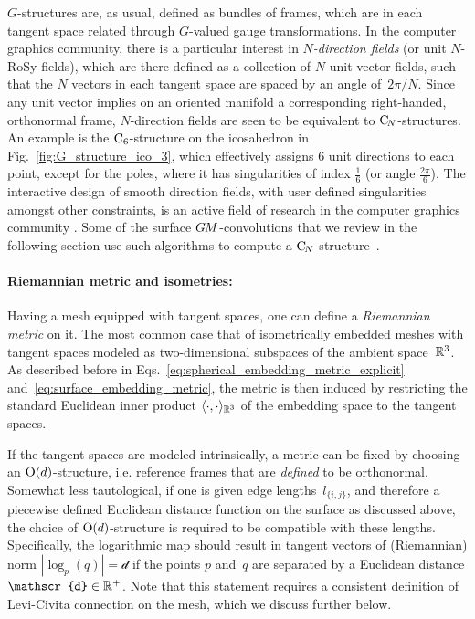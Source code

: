 $G$-structures are, as usual, defined as bundles of frames, which are in each tangent space related through $G$-valued gauge transformations.
In the computer graphics community, there is a particular interest in \emph{$N$-direction fields} (or unit $N$-RoSy fields), which are there defined as a collection of $N$ unit vector fields, such that the $N$ vectors in each tangent space are spaced by an angle of~$2\pi/N$.
Since any unit vector implies on an oriented manifold a corresponding right-handed, orthonormal frame, $N$-direction fields are seen to be equivalent to $\operatorname{C}_{\!N}$-structures.
An example is the $\operatorname{C}_{6}$-structure on the icosahedron in Fig.~\ref{fig:G_structure_ico_3}, which effectively assigns $6$ unit directions to each point, except for the poles, where it has singularities of index $\frac{1}{6}$ (or angle $\frac{2\pi}{6}$).
The interactive design of smooth direction fields, with user defined singularities amongst other constraints, is an active field of research in the computer graphics community
\cite{li2006representing,ray2008nSymmDirectionField,lai2009metric,craneTrivialConnectionsDiscrete2010,Knoppel:2013:GOD,liu2016discreteConnection,Sharp2019VectorHeatMethod}.
Some of the surface $G\mkern-1.4muM$-convolutions that we review in the following section use such algorithms to compute a $\operatorname{C}_{\!N}$-structure~\cite{huang2019texturenet,Yang2020parallelFrameCNN}.



\paragraph{Riemannian metric and isometries:}
Having a mesh equipped with tangent spaces, one can define a \emph{Riemannian metric} on it.
The most common case that of isometrically embedded meshes with tangent spaces modeled as two-dimensional subspaces of the ambient space~$\mathbb{R}^3$.
As described before in Eqs.~\eqref{eq:spherical_embedding_metric_explicit} and~\eqref{eq:surface_embedding_metric}, the metric is then induced by restricting the standard Euclidean inner product $\langle\cdot,\cdot\rangle_{\mathbb{R}^3}$ of the embedding space to the tangent spaces.

If the tangent spaces are modeled intrinsically, a metric can be fixed by choosing an $\operatorname{O}(d)$-structure, i.e. reference frames that are \emph{defined} to be orthonormal.
Somewhat less tautological, if one is given edge lengths~$l_{\{i,j\}}$, and therefore a piecewise defined Euclidean distance function on the surface as discussed above, the choice of $\operatorname{O}(d)$-structure is required to be compatible with these lengths.
Specifically, the logarithmic map should result in tangent vectors of (Riemannian) norm $|\log_p(q)| = \mathscr{d}$ if the points $p$ and~$q$ are separated by a Euclidean distance $\mathscr{d} \in \R^+$.
Note that this statement requires a consistent definition of Levi-Civita connection on the mesh, which we discuss further below.


